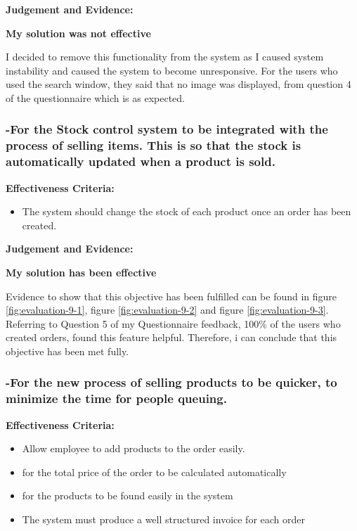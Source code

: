 \textbf{Judgement and Evidence:} \newline

\textbf{\large{My solution was not effective}}

I decided to remove this functionality from the system as I caused system instability and caused the system to become unresponsive. For the users who used the search window, they said that no image was displayed, from question 4 of the questionnaire which is as expected. 




\pagebreak
\subsubsection{-For the Stock control system to be integrated with the process of selling items. This is so that the stock is automatically updated when a product is sold.}
\label{stock-change-effectiveness}
\textbf{Effectiveness Criteria:}\newline
\begin{itemize}
	\item{The system should change the stock of each product once an order has been created.}
\end{itemize}

\textbf{Judgement and Evidence:} \newline

\textbf{\large{My solution has been effective}}

Evidence to show that this objective has been fulfilled can be found in figure \ref{fig:evaluation-9-1}, figure \ref{fig:evaluation-9-2} and figure \ref{fig:evaluation-9-3}. Referring to Question 5 of my Questionnaire feedback, 100\% of the users who created orders, found this feature helpful. Therefore, i can conclude that this objective has been met fully.




\pagebreak
\subsubsection{-For the new process of selling products to be quicker, to minimize the time for people queuing.}

\textbf{Effectiveness Criteria:}\newline
\begin{itemize}
	\item{Allow employee to add products to the order easily.}
	\item{for the total price of the order to be calculated automatically}
	\item{for the products to be found easily in the system}
	\item{The system must produce a well structured invoice for each order}
\end{itemize}

